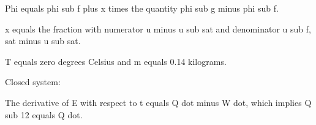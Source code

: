 Phi equals phi sub f plus x times the quantity phi sub g minus phi sub f.

x equals the fraction with numerator u minus u sub sat and denominator u sub f, sat minus u sub sat.

T equals zero degrees Celsius and m equals 0.14 kilograms.

Closed system:

The derivative of E with respect to t equals Q dot minus W dot, which implies Q sub 12 equals Q dot.